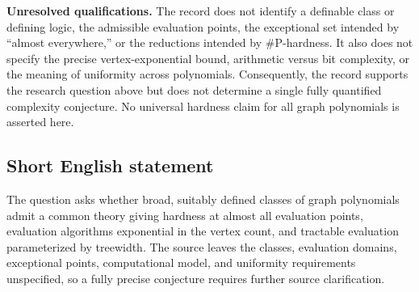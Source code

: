 \documentclass[11pt]{article}
\begin{document}
\textbf{Unresolved qualifications.} The record does not identify a definable class or defining logic, the admissible evaluation points, the exceptional set intended by ``almost everywhere,'' or the reductions intended by \(\#\mathrm{P}\)-hardness. It also does not specify the precise vertex-exponential bound, arithmetic versus bit complexity, or the meaning of uniformity across polynomials. Consequently, the record supports the research question above but does not determine a single fully quantified complexity conjecture. No universal hardness claim for all graph polynomials is asserted here.
\subsection{Short English statement}
The question asks whether broad, suitably defined classes of graph polynomials admit a common theory giving hardness at almost all evaluation points, evaluation algorithms exponential in the vertex count, and tractable evaluation parameterized by treewidth. The source leaves the classes, evaluation domains, exceptional points, computational model, and uniformity requirements unspecified, so a fully precise conjecture requires further source clarification.
\end{document}
